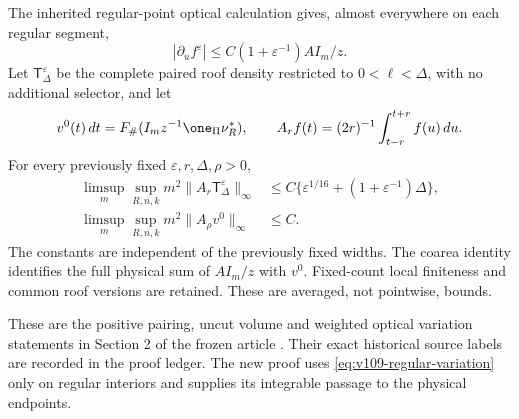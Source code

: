 \begin{inputstatement}
\label{input:v109-analytic}
The inherited regular-point optical calculation gives, almost
 everywhere on each regular segment,
\begin{equation}\label{eq:v109-regular-variation}
 |\partial_u f^\varepsilon|\leq
 C(1+\varepsilon^{-1})AI_m/z.
\end{equation}
Let $\mathsf T_\Delta^\varepsilon$ be the complete paired roof
density restricted to $0<\ell<\Delta$, with no additional selector,
and let
\[
 v^0(t)\,dt=F_\#(I_m z^{-1}\one_\Pi\nu_R^*),\qquad
 A_rf(t)=(2r)^{-1}\int_{t-r}^{t+r}f(u)\,du.
\]
For every previously fixed $\varepsilon,r,\Delta,\rho>0$,
\begin{align}
 \limsup_m\sup_{R,n,k}m^2\|A_r\mathsf T_\Delta^\varepsilon\|_\infty
 &\leq C\{\varepsilon^{1/16}+(1+\varepsilon^{-1})\Delta\},
 \label{eq:v109-paired-average}\\
 \limsup_m\sup_{R,n,k}m^2\|A_\rho v^0\|_\infty&\leq C.
 \label{eq:v109-volume-average}
\end{align}
The constants are independent of the previously fixed widths.
The coarea identity identifies the full physical sum of $AI_m/z$
with $v^0$. Fixed-count local finiteness and common roof versions
are retained. These are averaged, not pointwise, bounds.
\end{inputstatement}
These are the positive pairing, uncut volume and weighted optical
variation statements in Section 2 of the frozen article \cite{Q108}.
Their exact historical source labels are recorded in the proof ledger.
The new proof
uses \eqref{eq:v109-regular-variation} only on regular interiors and
supplies its integrable passage to the physical endpoints.

